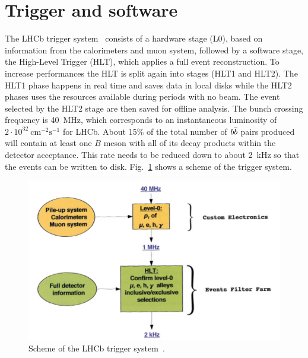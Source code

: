 \section{Trigger and software}
\label{sec:det_trigger}

The LHCb trigger system~\cite{LHCb-DP-2012-004} consists of a hardware stage (L0), based on information
from the calorimeters and muon system, followed by a software stage, the High-Level Trigger (HLT), which applies 
a full event reconstruction. To increase performances the HLT is split again into stages (HLT1 and HLT2). The 
HLT1 phase happens in real time and saves data in local disks while the HLT2 phases uses the resources
available during periods with no beam. The event selected by the HLT2 stage are then saved for offline analysis. 
The bunch crossing frequency is 40~$\mbox{MHz}$, which corresponds to an instantaneous luminosity of 
$2 \cdot 10^{32} ~\mbox{cm}^{-2} \mbox{s}^{-1}$ for LHCb. About 15\% of the total number of
$b\overline {b}$ pairs produced will contain at least one $B$ meson with all of its decay products 
within the detector acceptance. This rate needs to be reduced down to about 2~kHz so that the events can be 
written to disk. Fig.~\ref{fig:triggerscheme} shows a scheme of the trigger system.
%
\begin{figure}[h!]
\centering 
\includegraphics[width=0.9\linewidth]{Detector/figs/triggerscheme.png}
\caption{Scheme of the LHCb trigger system~\cite{Alves:2008zz}.}
\label{fig:triggerscheme}
\end{figure}

